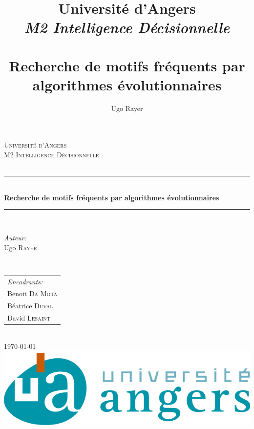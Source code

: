\documentclass[a4paper,10pt]{report}
\title{Université d'Angers \\  \emph{M2 Intelligence Décisionnelle \\} \hrulefill \\ \textbf{Recherche de motifs fréquents par algorithmes évolutionnaires} \\ \hrulefill}
\author{Ugo Rayer}
\begin{document}
    \begin{titlepage}

\newcommand{\HRule}{\rule{\linewidth}{0.5mm}}

\center 

\textsc{\LARGE Université d'Angers}\\[1.5cm] 
\textsc{\Large M2 Intelligence Décisionnelle}\\ [0.5cm] 
\textsc{\large }\\[0.5cm] 


\HRule \\[0.4cm]
{ \huge \bfseries Recherche de motifs fréquents par algorithmes évolutionnaires}\\[0.4cm] 
\HRule \\[1.5cm]
 

\begin{minipage}{0.4\textwidth}
\begin{flushleft} \large
\emph{Auteur:}\\
Ugo \textsc{Rayer} 
\end{flushleft}
\end{minipage}
~
\begin{minipage}{0.4\textwidth}
\begin{flushright} \large
\hfill
\begin{tabular}{@{}l@{}}
\emph{Encadrants:}\\
Benoit \textsc{Da Mota} \\
Béatrice \textsc{Duval} \\
David \textsc{Lesaint} 
\end{tabular}
\end{flushright}
\end{minipage}\\[4cm]



{\large \today}\\[3cm] 



\includegraphics{./img/ua.jpg}\\[1cm]

\vfill 

\end{titlepage}
\end{document}
